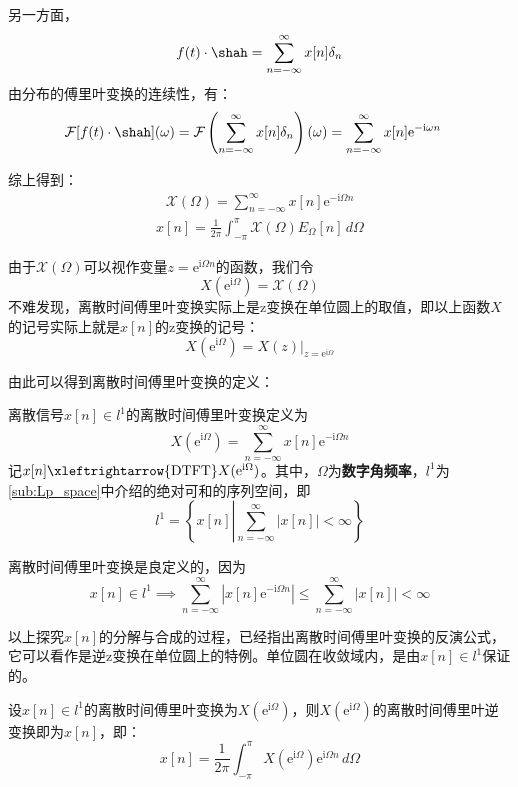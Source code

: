 另一方面，
$$f(t)\cdot\shah=\sum_{n=-\infty}^{\infty}x[n]\delta_{n}$$
由分布的傅里叶变换的连续性，有：
\begin{align*}
    \mathcal{F} [f(t)\cdot\shah](\omega)&=\mathcal{F} \left(\sum_{n=-\infty}^{\infty}x[n]\delta_{n}\right)(\omega)=\sum_{n=-\infty}^{\infty}x[n]\mathrm{e}^{-\mathrm{i}\omega n}
\end{align*}

综上得到：\begin{align*}
    \mathcal{X} (\Omega)=\sum_{n=-\infty}^{\infty}x[n]\mathrm{e}^{-\mathrm{i}\Omega n}
\end{align*}
\begin{align*}
    x[n]=\frac{1}{2\pi}\int_{-\pi}^{\pi}\mathcal{X} (\Omega)E_{\Omega}[n]\,d\Omega
\end{align*}

由于$\mathcal{X} (\Omega)$可以视作变量$z=\mathrm{e}^{\mathrm{i}\Omega n}$的函数，我们令
$$X(\mathrm{e}^{\mathrm{i}\Omega})=\mathcal{X} (\Omega)$$
不难发现，离散时间傅里叶变换实际上是z变换在单位圆上的取值，即以上函数$X$的记号实际上就是$x[n]$的z变换的记号：
\[X(\mathrm{e}^{\mathrm{i}\Omega})=X(z)|_{z=\mathrm{e}^{\mathrm{i}\Omega}}\]

由此可以得到离散时间傅里叶变换的定义：

\begin{definition}[离散时间傅里叶变换]
    离散信号$x[n]\in l^1$的离散时间傅里叶变换定义为
    \[X(\mathrm{e}^{\mathrm{i}\Omega})=\sum_{n=-\infty}^{\infty}x[n]\mathrm{e}^{-\mathrm{i}\Omega n}\]
    记$x[n]\xleftrightarrow{\mathrm{DTFT}}X(\mathrm{e}^{\mathrm{i}\Omega})$。其中，$\Omega $为\textbf{数字角频率}，$l^1$为\ref{sub:Lp_space}中介绍的绝对可和的序列空间，即
    \[l^1=\left\{x[n]\left|\sum_{n=-\infty}^{\infty}|x[n]|<\infty\right.\right\}\]
\end{definition}

离散时间傅里叶变换是良定义的，因为
\[x[n]\in l^1\implies \sum_{n=-\infty}^{\infty}\left|x[n]\mathrm{e}^{-\mathrm{i}\Omega n}\right|\leq \sum_{n=-\infty}^{\infty}|x[n]|<\infty\]

以上探究$x[n]$的分解与合成的过程，已经指出离散时间傅里叶变换的反演公式，它可以看作是逆z变换在单位圆上的特例。单位圆在收敛域内，是由$x[n]\in l^1$保证的。
\begin{theorem}[离散时间傅里叶反演公式]
    设$x[n]\in l^1$的离散时间傅里叶变换为$X(\mathrm{e}^{\mathrm{i}\Omega})$，则$X(\mathrm{e}^{\mathrm{i}\Omega})$的离散时间傅里叶逆变换即为$x[n]$，即：
    \[x[n]=\frac{1}{2\pi}\int_{-\pi}^{\pi}X(\mathrm{e}^{\mathrm{i}\Omega})\mathrm{e}^{\mathrm{i}\Omega n}\,d\Omega\]
\end{theorem}

